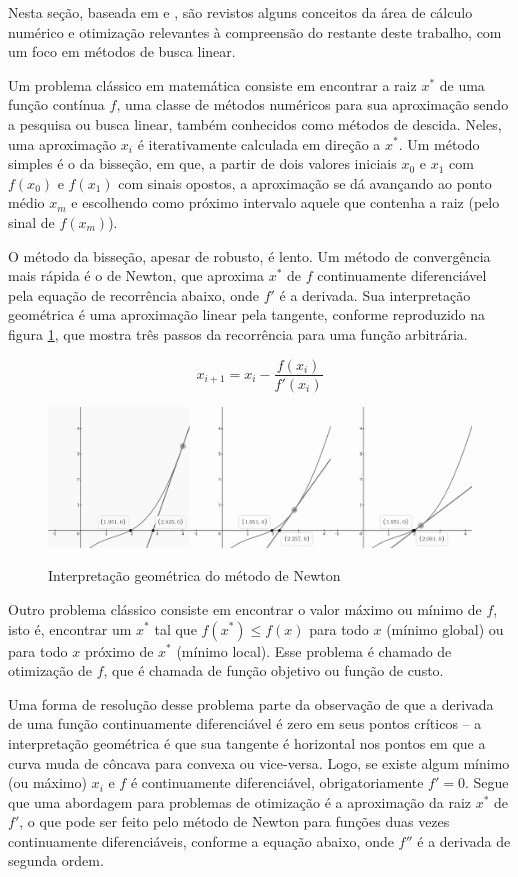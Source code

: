 \documentclass[cic,tc]{iiufrgs}
\begin{document}
Nesta seção, baseada em \cite{stewart1991calculus} e
\cite{nocedal2006numerical}, são revistos alguns conceitos da área de cálculo
numérico e otimização relevantes à compreensão do restante deste trabalho, com
um foco em métodos de busca linear.

Um problema clássico em matemática consiste em encontrar a raiz $x^*$ de uma
função contínua $f$, uma classe de métodos numéricos para sua aproximação sendo
a pesquisa ou busca linear, também conhecidos como métodos de descida. Neles,
uma aproximação $x_i$ é iterativamente calculada em direção a $x^*$. Um método
simples é o da bisseção, em que, a partir de dois valores iniciais $x_0$ e
$x_1$ com $f(x_0)$ e $f(x_1)$ com sinais opostos, a aproximação se dá avançando
ao ponto médio $x_m$ e escolhendo como próximo intervalo aquele que contenha a
raiz (pelo sinal de $f(x_m)$).

O método da bisseção, apesar de robusto, é lento. Um método de convergência
mais rápida é o de Newton, que aproxima $x^*$ de $f$ continuamente diferenciável
pela equação de recorrência abaixo, onde $f'$ é a derivada. Sua interpretação
geométrica é uma aproximação linear pela tangente, conforme reproduzido na
figura \ref{fig:tan}, que mostra três passos da recorrência para uma função
arbitrária. 

$$ x_{i + 1} = x_i - \frac{f(x_i)}{f'(x_i)} $$

\begin{figure} \caption{Interpretação geométrica do método de Newton} \begin{center}
\includegraphics[width=0.8\linewidth]{img/tan.png} \end{center}
 \label{fig:tan} \end{figure}

Outro problema clássico consiste em encontrar o valor máximo ou mínimo de $f$,
isto é, encontrar um $x^*$ tal que $f(x^*) \le f(x)$ para todo $x$ (mínimo
global) ou para todo $x$ próximo de $x^*$ (mínimo local). Esse problema é
chamado de otimização de $f$, que é chamada de função objetivo ou função de
custo. 

Uma forma de resolução desse problema parte da observação de que a derivada de
uma função continuamente diferenciável é zero em seus pontos críticos -- a
interpretação geométrica é que sua tangente é horizontal nos pontos em que a
curva muda de côncava para convexa ou vice-versa. Logo, se existe algum mínimo
(ou máximo) $x_i$ e $f$ é continuamente diferenciável, obrigatoriamente $f' =
0$. Segue que uma abordagem para problemas de otimização é a aproximação da
raiz $x^*$ de $f'$, o que pode ser feito pelo método de Newton para funções
duas vezes continuamente diferenciáveis, conforme a equação abaixo, onde $f''$
é a derivada de segunda ordem.
\end{document}
